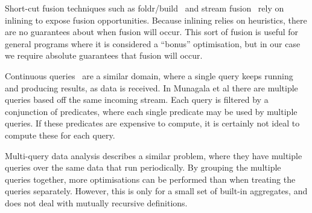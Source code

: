 Short-cut fusion techniques such as foldr/build~\cite{gill1993short} and stream fusion~\cite{coutts2007stream} rely on inlining to expose fusion opportunities.
Because inlining relies on heuristics, there are no guarantees about when fusion will occur.
This sort of fusion is useful for general programs where it is considered a ``bonus'' optimisation, but in our case we require absolute guarantees that fusion will occur.


Continuous queries~\cite{chandrasekaran2003telegraphcq, arasu2003cql, babu2001continuous, madden2002continuously,shirsath2016query,munagala2007optimization} are a similar domain, where a single query keeps running and producing results, as data is received.
In Munagala et al there are multiple queries based off the same incoming stream.
Each query is filtered by a conjunction of predicates, where each single predicate may be used by multiple queries.
If these predicates are expensive to compute, it is certainly not ideal to compute these for each query.


Multi-query data analysis\cite{andrade2003efficient} describes a similar problem, where they have multiple queries over the same data that run periodically.
By grouping the multiple queries together, more optimisations can be performed than when treating the queries separately.
However, this is only for a small set of built-in aggregates, and does not deal with mutually recursive definitions.


